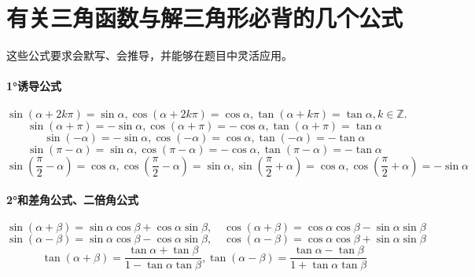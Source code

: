 \newpage
\section{有关三角函数与解三角形必背的几个公式}
\begingroup
\setlength{\abovedisplayskip}{4pt}
\setlength{\belowdisplayskip}{4pt}
\setlength{\abovedisplayshortskip}{2pt}
\setlength{\belowdisplayshortskip}{2pt}
这些公式要求会默写、会推导，并能够在题目中灵活应用。

\paragraph{1°诱导公式} \mbox{}
\begin{equation*}
\sin \left( \alpha + 2 k \pi \right) = \sin \alpha , \cos \left( \alpha + 2 k \pi \right) = \cos \alpha , \tan \left( \alpha + k \pi \right) = \tan \alpha , k \in \mathbb{Z} .
\end{equation*}
\begin{equation*}
\sin \left( \alpha + \pi \right) = - \sin \alpha , \cos \left( \alpha + \pi \right) = - \cos \alpha , \tan \left( \alpha + \pi \right) = \tan \alpha
\end{equation*}
\begin{equation*}
\sin \left( - \alpha \right) = - \sin \alpha , \cos \left( - \alpha \right) = \cos \alpha , \tan \left( - \alpha \right) = - \tan \alpha
\end{equation*}
\begin{equation*}
\sin \left( \pi - \alpha \right) = \sin \alpha , \cos \left( \pi - \alpha \right) = - \cos \alpha , \tan \left( \pi - \alpha \right) = - \tan \alpha
\end{equation*}
\begin{equation*}
\sin \left( \frac{\pi}{2} - \alpha \right) = \cos \alpha , \cos \left( \frac{\pi}{2} - \alpha \right) = \sin \alpha , \sin \left( \frac{\pi}{2} + \alpha \right) = \cos \alpha , \cos \left( \frac{\pi}{2} + \alpha \right) = - \sin \alpha
\end{equation*}
\paragraph{2°和差角公式、二倍角公式} \mbox{}
\begin{equation*}
\sin \left( \alpha + \beta \right) = \sin \alpha \cos \beta + \cos \alpha \sin \beta , \quad \cos \left( \alpha + \beta \right) = \cos \alpha \cos \beta - \sin \alpha \sin \beta
\end{equation*}
\begin{equation*}
\sin \left( \alpha - \beta \right) = \sin \alpha \cos \beta - \cos \alpha \sin \beta , \quad \cos \left( \alpha - \beta \right) = \cos \alpha \cos \beta + \sin \alpha \sin \beta
\end{equation*}
\begin{equation*}
\tan \left( \alpha + \beta \right) = \frac{\tan \alpha + \tan \beta}{1 - \tan \alpha \tan \beta} , \tan \left( \alpha - \beta \right) = \frac{\tan \alpha - \tan \beta}{1 + \tan \alpha \tan \beta}
\end{equation*}

